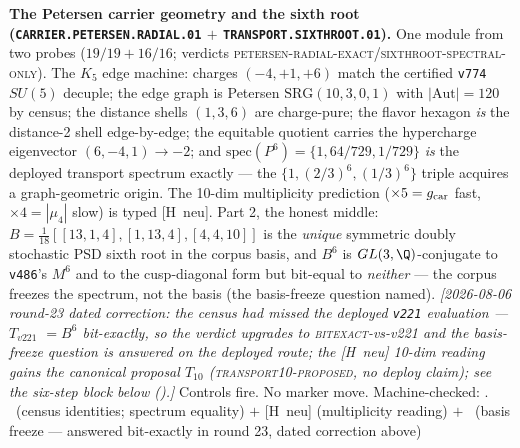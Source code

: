 \par\smallskip\noindent\textbf{The Petersen carrier geometry and
the sixth root (\texttt{CARRIER.PETERSEN.RADIAL.01} $+$
\texttt{TRANSPORT.SIXTHROOT.01}).}
One module from two probes ($19/19+16/16$; verdicts
\textsc{petersen-radial-exact}/\textsc{sixthroot-spectral-only}).
The $K_5$ edge machine: charges $(-4,+1,+6)$ match the certified
\texttt{v774} $SU(5)$ decuple; the edge graph is Petersen
$\mathrm{SRG}(10,3,0,1)$ with $|\mathrm{Aut}|=120$ by census; the distance
shells $(1,3,6)$ are charge-pure; the flavor hexagon \emph{is} the
distance-2 shell edge-by-edge; the equitable quotient carries the
hypercharge eigenvector $(6,-4,1)\to-2$; and
$\mathrm{spec}(P^6)=\{1,64/729,1/729\}$ \emph{is} the deployed
transport spectrum exactly --- the $\{1,(2/3)^6,(1/3)^6\}$ triple
acquires a graph-geometric origin.  The 10-dim multiplicity
prediction ($\times5=g_{\mathrm{car}}$ fast, $\times4=|\mu_4|$ slow) is typed
[H~neu].  Part 2, the honest middle:
$B=\tfrac1{18}[[13,1,4],[1,13,4],[4,4,10]]$ is the \emph{unique}
symmetric doubly stochastic PSD sixth root in the corpus basis, and
$B^6$ is $GL(3,\Q)$-conjugate to \texttt{v486}'s $M^6$ and to the
cusp-diagonal form but bit-equal to \emph{neither} --- the corpus
freezes the spectrum, not the basis (the basis-freeze question
named).  \emph{[2026-08-06 round-23 dated correction: the census
had missed the deployed \texttt{v221} evaluation --- $T_{v221}$
$=B^6$ \emph{bit-exactly}, so the verdict upgrades to
\textsc{bitexact}-vs-v221 and the basis-freeze question is
answered on the deployed route; the [H~neu] 10-dim reading gains
the canonical proposal $T_{10}$ (\textsc{transport10-proposed},
no deploy claim); see the six-step block below
().]}
Controls fire.  No marker move.
Machine-checked: .
\mE\ (census identities; spectrum equality) $+$ [H~neu]
(multiplicity reading) $+$ \mO\ (basis freeze --- answered
bit-exactly in round 23, dated correction above)
\par\smallskip

